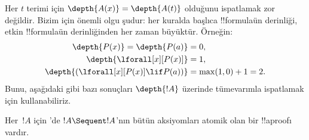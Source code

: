 \documentclass[../../../include/open-logic-section]{subfiles}
\begin{document}
Her $t$ terimi için $\depth{A(x)} = \depth{A(t)}$ olduğunu ispatlamak zor
değildir. Bizim için önemli olgu şudur: her kuralda başlıca !!{formula}{}ün
derinliği, etkin !!{formula}{}ün derinliğinden her zaman büyüktür. Örneğin:
\begin{align*}
\depth{P(x)} = \depth{P(a)} & = 0,\\
\depth{\lforall[x][P(x)]} & = 1,\\
\depth{(\lforall[x][P(x)] \lif P(a))} & = \max(1,0) + 1 = 2.
\end{align*}
Bunu, aşağıdaki gibi bazı sonuçları $\depth{!A}$ üzerinde tümevarımla
ispatlamak için kullanabiliriz.

\begin{prop}
Her~$!A$ için 'de $!A \Sequent !A$'nın bütün aksiyomları atomik
olan bir !!a{proof}{}ı vardır.
\end{prop}
\end{document}
